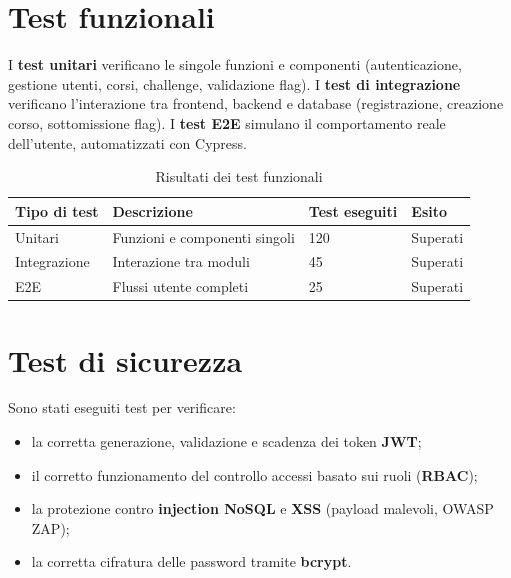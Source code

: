 \section{Test funzionali}
\label{sec:test-funzionali}

I \textbf{test unitari} verificano le singole funzioni e componenti (autenticazione, gestione utenti, corsi, challenge, validazione flag). I \textbf{test di integrazione} verificano l'interazione tra frontend, backend e database (registrazione, creazione corso, sottomissione flag). I \textbf{test E2E} simulano il comportamento reale dell'utente, automatizzati con Cypress.

\begin{table}[H]
    \centering
    \caption{Risultati dei test funzionali}
    \label{tab:risultati-test-funzionali}
    \renewcommand{\arraystretch}{1.3}
    \begin{tabular}{|p{3cm}|p{6.5cm}|p{2.5cm}|p{2.5cm}|}
        \hline
        \textbf{Tipo di test} & \textbf{Descrizione} & \textbf{Test eseguiti} & \textbf{Esito} \\
        \hline
        Unitari & Funzioni e componenti singoli & 120 & Superati \\
        \hline
        Integrazione & Interazione tra moduli & 45 & Superati \\
        \hline
        E2E & Flussi utente completi & 25 & Superati \\
        \hline
    \end{tabular}
\end{table}

\section{Test di sicurezza}
\label{sec:test-sicurezza}

Sono stati eseguiti test per verificare:
\begin{itemize}[leftmargin=1.5cm]
    \item la corretta generazione, validazione e scadenza dei token \textbf{JWT};
    \item il corretto funzionamento del controllo accessi basato sui ruoli (\textbf{RBAC});
    \item la protezione contro \textbf{injection NoSQL} e \textbf{XSS} (payload malevoli, OWASP ZAP);
    \item la corretta cifratura delle password tramite \textbf{bcrypt}.
\end{itemize}

